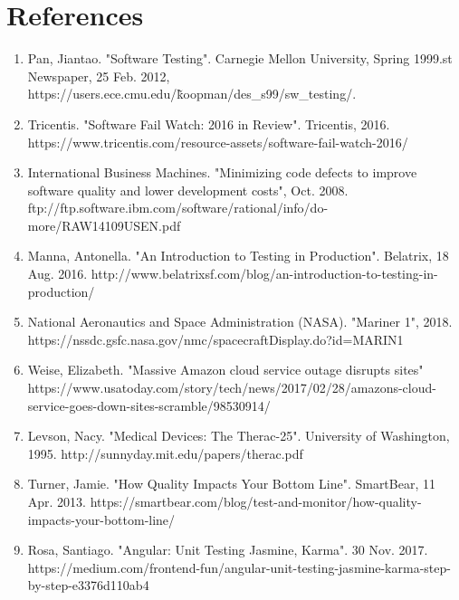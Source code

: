 \documentclass[12pt]{report}
\begin{document}
\section*{References}

\small
\begin{enumerate}
\item Pan, Jiantao. "Software Testing". Carnegie Mellon University, Spring 1999.st Newspaper, 25 Feb. 2012, https://users.ece.cmu.edu/\~koopman/des\_s99/sw\_testing/.

\item Tricentis. "Software Fail Watch: 2016 in Review". Tricentis, 2016. https://www.tricentis.com/resource-assets/software-fail-watch-2016/

\item International Business Machines. "Minimizing code defects to improve software quality and lower development costs", Oct. 2008. ftp://ftp.software.ibm.com/software/rational/info/do-more/RAW14109USEN.pdf

\item Manna, Antonella. "An Introduction to Testing in Production". Belatrix, 18 Aug. 2016. http://www.belatrixsf.com/blog/an-introduction-to-testing-in-production/

\item National Aeronautics and Space Administration (NASA). "Mariner 1", 2018. https://nssdc.gsfc.nasa.gov/nmc/spacecraftDisplay.do?id=MARIN1

\item Weise, Elizabeth. "Massive Amazon cloud service outage disrupts sites"
https://www.usatoday.com/story/tech/news/2017/02/28/amazons-cloud-service-goes-down-sites-scramble/98530914/

\item Levson, Nacy. "Medical Devices: The Therac-25". University of Washington, 1995. http://sunnyday.mit.edu/papers/therac.pdf

\item Turner, Jamie. "How Quality Impacts Your Bottom Line". SmartBear, 11 Apr. 2013. https://smartbear.com/blog/test-and-monitor/how-quality-impacts-your-bottom-line/

\item Rosa, Santiago. "Angular: Unit Testing Jasmine, Karma". 30 Nov. 2017. https://medium.com/frontend-fun/angular-unit-testing-jasmine-karma-step-by-step-e3376d110ab4
\end{enumerate}
\end{document}
